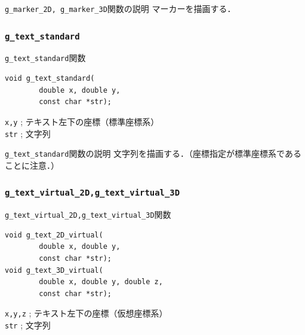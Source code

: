 \documentclass[a4paper,12pt]{jsarticle}%
\begin{document}
\begin{itembox}[l]{\texttt{g\_marker\_2D, g\_marker\_3D}関数の説明}
マーカーを描画する．
\end{itembox}

\begin{figure}[htb]
\end{figure}



\clearpage
\subsubsection{\texttt{g\_text\_standard}}

\begin{itembox}[l]{\texttt{g\_text\_standard}関数}
\begin{verbatim}
void g_text_standard(
        double x, double y,
        const char *str);
\end{verbatim}
\verb|x,y| ; テキスト左下の座標（標準座標系）\\
\verb|str| ; 文字列\\
\end{itembox}

\begin{itembox}[l]{\texttt{g\_text\_standard}関数の説明}
文字列を描画する．（座標指定が標準座標系であることに注意．）
\end{itembox}


\subsubsection{\texttt{g\_text\_virtual\_2D,g\_text\_virtual\_3D}}

\begin{itembox}[l]{\texttt{g\_text\_virtual\_2D,g\_text\_virtual\_3D}関数}
\begin{verbatim}
void g_text_2D_virtual(
        double x, double y,
        const char *str);
void g_text_3D_virtual(
        double x, double y, double z,
        const char *str);      
\end{verbatim}
\verb|x,y,z| ; テキスト左下の座標（仮想座標系）\\
\verb|str| ; 文字列\\
\end{itembox}
\end{document}
